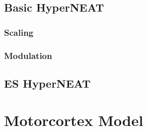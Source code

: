 \subsection{Basic HyperNEAT}
\subsubsection{Scaling}
\subsubsection{Modulation}
\subsection{ES HyperNEAT}\label{ES_HYPERNEAT}

\section{Motorcortex Model}\label{MotorCortex_Model}